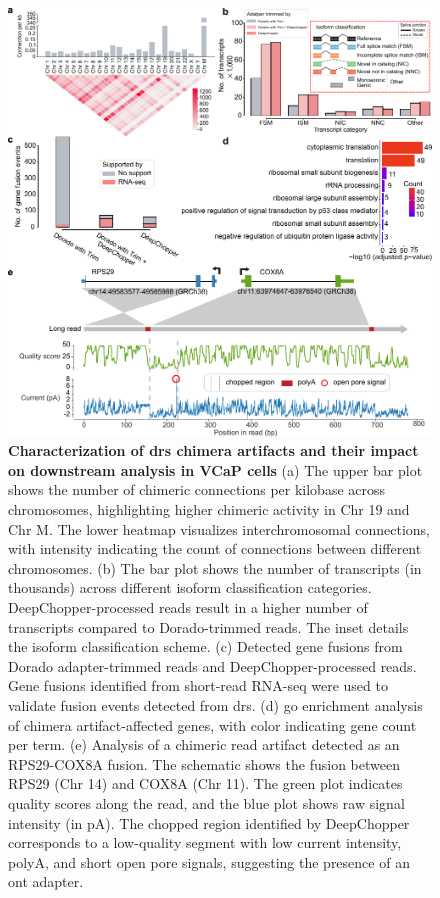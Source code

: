 \documentclass[pdflatex,sn-nature, lineno]{sn-jnl}%
\begin{document}
\begin{figure}[!ht]
    \includegraphics[height=1\columnwidth]{finals/figure3}
    \caption{{\bf Characterization of \gls{drs} chimera artifacts and their impact on downstream analysis in VCaP cells} (a) The upper bar plot shows the number of chimeric connections per kilobase across chromosomes, highlighting higher chimeric activity in Chr 19 and Chr M. The lower heatmap visualizes interchromosomal connections, with intensity indicating the count of connections between different chromosomes. (b) The bar plot shows the number of transcripts (in thousands) across different isoform classification categories. DeepChopper-processed reads result in a higher number of transcripts compared to Dorado-trimmed reads. The inset details the isoform classification scheme. (c) Detected gene fusions from Dorado adapter-trimmed reads and DeepChopper-processed reads. Gene fusions identified from short-read RNA-seq were used to validate fusion events detected from \gls{drs}. (d) \gls{go} enrichment analysis of chimera artifact-affected genes, with color indicating gene count per term. (e) Analysis of a chimeric read artifact detected as an RPS29-COX8A fusion. The schematic shows the fusion between RPS29 (Chr 14) and COX8A (Chr 11). The green plot indicates quality scores along the read, and the blue plot shows raw signal intensity (in pA). The chopped region identified by DeepChopper corresponds to a low-quality segment with low current intensity, polyA, and short open pore signals, suggesting the presence of an \gls{ont} adapter.}\label{fig:f3}
\end{figure}
\end{document}
